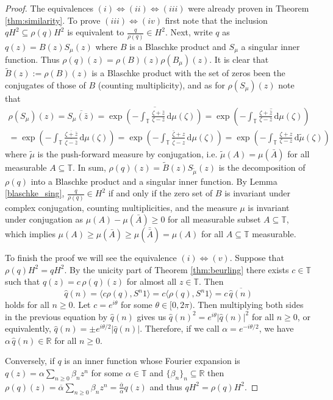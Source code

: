 \documentclass[a4paper,12pt]{amsart}
\def\d{\,{\mathrm{d}}}
\def\T{{\mathbb{T}}}
\def\R{{\mathbb{R}}}
\newcommand{\abs}[1]{{\left|{#1}\right|}}
\newcommand{\scal}[1]{{\langle{#1}\rangle}}
\theoremstyle{definition}
\begin{document}
\begin{proof}
The equivalences $(i)\Leftrightarrow(ii)\Leftrightarrow(iii)$ were already proven in Theorem \ref{thm:similarity}. To prove $(iii)\Leftrightarrow(iv)$ first note that the inclusion $qH^2\subseteq\rho(q)H^2$ is equivalent to $\frac{q}{\rho(q)}\in H^2$. Next, write $q$ as $q(z)=B(z)S_\mu(z)$ where $B$ is a Blaschke product and $S_\mu$ a singular inner function. Thus $\rho(q)(z)=\rho(B)(z)\rho(B_\mu)(z)$. It is clear that $\tilde{B}(z):=\rho(B)(z)$ is a Blaschke product with the set of zeros been the conjugates of those of $B$ (counting multiplicity), and as for $\rho(S_\mu)(z)$ note that
\begin{multline*}
\rho(S_\mu)(z)=\overline{S_\mu(\bar{z})}=\overline{\exp\left(-\int_\T\frac{\zeta+\bar{z}}{\zeta-\bar{z}}\d\mu(\zeta)\right)}=\exp\left(\overline{-\int_\T\frac{\zeta+\bar{z}}{\zeta-\bar{z}}\d\mu(\zeta)}\right)
\\
=\exp\left(-\int_\T\frac{\overline{\zeta+\bar{z}}}{\overline{\zeta-\bar{z}}}\d\mu(\zeta)\right)=\exp\left(-\int_\T\frac{\bar{\zeta}+z}{\bar{\zeta}-z}\d\mu(\zeta)\right)=\exp\left(-\int_\T\frac{\zeta+z}{\zeta-z}\d\tilde{\mu}(\zeta)\right)
\end{multline*}
where $\tilde{\mu}$ is the push-forward measure by conjugation, i.e. $\tilde{\mu}(A)=\mu(\bar{A})$ for all measurable $A\subseteq\T$. In sum, $\rho(q)(z)=\tilde{B}(z)S_{\tilde{\mu}}(z)$ is the decomposition of $\rho(q)$ into a Blaschke product and a singular inner function. By Lemma \ref{blaschke_sing}, $\frac{q}{\rho(q)}\in H^2$ if and only if the zero set of $B$ is invariant under complex conjugation, counting multiplicities, and the measure $\mu$ is invariant under conjugation as $\mu(A)-\mu(\bar{A})\geqslant0$ for all measurable subset $A\subseteq\T$, which implies $\mu(A)\geqslant\mu(\bar{A})\geqslant\mu(\bar{\bar{A}})=\mu(A)$ for all $A\subseteq\T$ measurable.

To finish the proof we will see the equivalence $(i)\Leftrightarrow(v)$. Suppose that $\rho(q)H^2=qH^2$. By the unicity part of Theorem \ref{thm:beurling} there exists $c\in\T$ such that $q(z)=c\,\rho(q)(z)$ for almost all $z\in\T$. Then 
\begin{equation*}
\widehat{q}(n)=\scal{c\rho(q),S^n1}=c\scal{\rho(q),S^n1}=c\,\overline{\widehat{q}(n)}
\end{equation*}
holds for all $n\geqslant0$. Let $c=e^{i\theta}$ for some $\theta\in[0,2\pi)$. Then multiplying both sides in the previous equation by $\widehat{q}(n)$ gives us $\widehat{q}(n)^2=e^{i\theta}\abs{\widehat{q}(n)}^2$ for all $n\geqslant0$, or equivalently, $\widehat{q}(n)=\pm e^{i\theta/2}\abs{\widehat{q}(n)}$. Therefore, if we call $\alpha = e^{-i\theta/2}$, we have $\alpha\,\widehat{q}(n)\in\R$ for all $n\geqslant0$.

Conversely, if $q$ is an inner function whose Fourier expansion is 
$q(z)=\alpha\sum_{n\geqslant0}\beta_nz^n$ for some $\alpha\in\T$ and $\{\beta_n\}_n\subseteq\R$ then $\rho(q)(z)=\overline{\alpha}\sum_{n\geqslant0}\beta_nz^n=\frac{\overline{\alpha}}{\alpha}q(z)$ and thus $qH^2=\rho(q)H^2$.
\end{proof}
\end{document}
